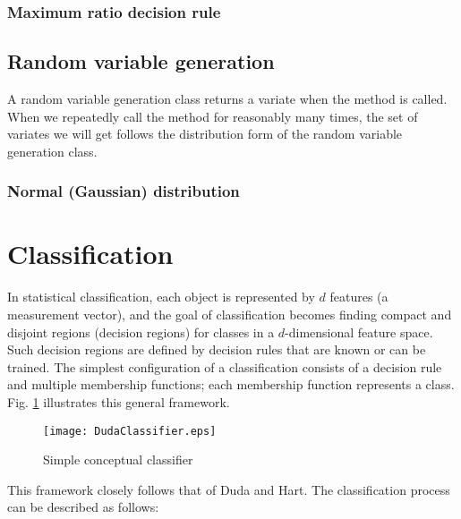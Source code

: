

\subsubsection{Maximum ratio decision rule}
\label{sec:MaximumRatioDecisionRule}



\subsection{Random variable generation}
\label{sec:RandomVariableGeneration}

A random variable generation class returns a variate when the
 method is called. When we repeatedly call the method
for reasonably many times, the set of variates we will get follows
the distribution form of the random variable generation class.
 
\subsubsection{Normal (Gaussian) distribution}
\label{sec:NormalVariateGeneration}



\section{Classification}
\label{sec:Classification}

In statistical classification, each object is represented by $d$
features (a measurement vector), and the goal of classification
becomes finding compact and disjoint regions (decision
regions\cite{Duda2000}) for classes in a $d$-dimensional feature
space. Such decision regions are defined by
decision rules that are known or can be trained.  The simplest
configuration of a classification consists of a decision rule and
multiple membership functions; each membership function represents a
class. Fig. \ref{fig:simple} illustrates this general framework.

\begin{figure}[h]
  \centering
  \texttt{[image: DudaClassifier.eps]}
  \caption{Simple conceptual classifier}
  \label{fig:simple}
\end{figure}

This framework closely follows that of Duda and
Hart\cite{Duda2000}. The classification process can be described
as follows:

